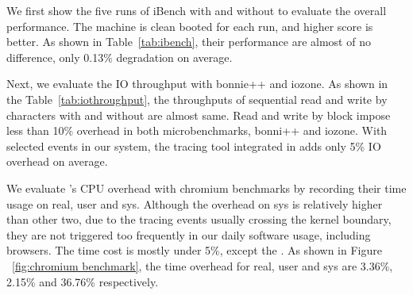 We first show the five runs of iBench with and without \xxx to evaluate the
overall performance. The machine is clean booted for each run, and higher
score is better. As shown in Table~\ref{tab:ibench}, their
performance are almost of no difference, only 0.13\% degradation on average.


Next, we evaluate the IO throughput with bonnie++ and iozone. As shown in the
Table~\ref{tab:iothroughput}, the throughputs of sequential read and write
by characters with and without \xxx are almost same. Read and write by block
impose less than 10\% overhead in  both microbenchmarks, bonni++ and iozone.
With selected events in our system, the tracing tool integrated in \xxx
adds only 5\% IO overhead on average.


We evaluate \xxx's CPU overhead with chromium benchmarks by recording their
time usage on real, user and sys. Although the overhead on sys is relatively
higher than other two, due to the tracing events usually crossing the
kernel boundary, they are not triggered too frequently in our daily software
usage, including browsers. The time cost is mostly under 5\%, except the
. As shown in Figure ~\ref{fig:chromium
benchmark}, the time overhead for real, user and sys are 3.36\%, 2.15\% and 36.76\%
respectively.
